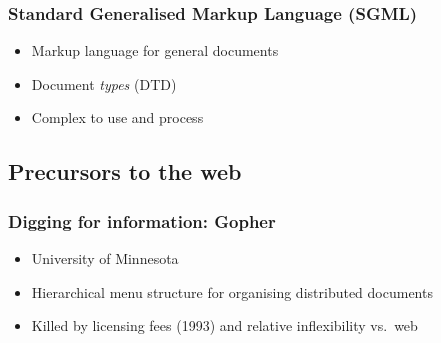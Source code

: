 \frame
{
	\frametitle{Standard Generalised Markup Language (SGML)}

	\begin{itemize}
	
		\item Markup language for general documents
		
		\item Document \emph{types} (DTD)
		
		
		\item Complex to use and process
	
	\end{itemize}
	
	
	\note{~}
}




\subsection*{Precursors to the web}




% 
% 	
% 	
% 		
% 	
% 	
% 	





\frame
{
	\frametitle{Digging for information: Gopher}
	
	\begin{itemize}
	
		\item University of Minnesota
		
		\item Hierarchical menu structure for organising distributed
		documents
		
		\item Killed by licensing fees (1993) and relative inflexibility
		vs.\ web
	
	\end{itemize}

	
	\note{~}
}

